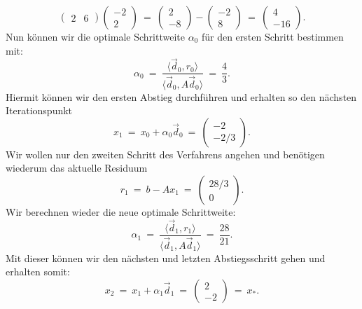 \begin{example}{}{}
\begin{equation*}
\begin{pmatrix}
2 & 6
\end{pmatrix}
\begin{pmatrix}
-2\\
2
\end{pmatrix}
\ = \
\begin{pmatrix}
2 \\
-8
\end{pmatrix} - 
\begin{pmatrix}
-2 \\
8
\end{pmatrix}
\ = \ 
\begin{pmatrix}
4 \\
-16
\end{pmatrix}.
\end{equation*}
Nun können wir die optimale Schrittweite $\alpha_0$ für den ersten Schritt bestimmen mit:
\begin{equation*}
\alpha_0 \ = \ \frac{\langle \vec{d}_0, r_0\rangle}{\langle \vec{d}_0, A \vec{d}_0 \rangle} \ = \
\frac{4}{3}.
\end{equation*}
Hiermit können wir den ersten Abstieg durchführen und erhalten so den nächsten Iterationspunkt
\begin{equation*}
x_1 \ = \ x_0 + \alpha_0 \vec{d}_0 \ = \ 
\begin{pmatrix}
-2 \\
- 2/3
\end{pmatrix}.
\end{equation*}
Wir wollen nur den zweiten Schritt des Verfahrens angehen und benötigen wiederum das aktuelle Residuum
\begin{equation*}
r_1 \ = \ b - Ax_1 \ = \ 
\begin{pmatrix}
28/3 \\
0
\end{pmatrix}.
\end{equation*}
Wir berechnen wieder die neue optimale Schrittweite:
\begin{equation*}
\alpha_1 \ = \ \frac{\langle \vec{d}_1, r_1\rangle}{\langle \vec{d}_1, A \vec{d}_1 \rangle} \ = \
\frac{28}{21}.
\end{equation*}
Mit dieser können wir den nächsten und letzten Abstiegsschritt gehen und erhalten somit:
\begin{equation*}
x_2 \ = \ x_1 + \alpha_1 \vec{d}_1 \ = \
\begin{pmatrix}
2\\
-2
\end{pmatrix}
\ = \ x_*.
\end{equation*}
\end{example}


